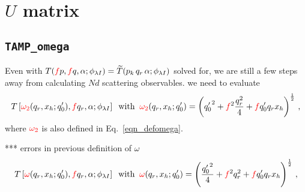 \documentclass[11pt,aps]{revtex4}
\newcommand{\PF}{{\color{red}f}}
\newcommand{\cor}[1]{{\color{blue} #1 }}
\newcommand{\orig}[1]{{\color{red} #1 }}
\newcommand{\cmplx}[1]{{\color{red} #1 }}
\begin{document}
\section{$U$ matrix}

\subsection{\texttt{TAMP\_omega}}
Even with $T(\PF p, \PF q, \alpha; \phi_{\lambda I}) = \widetilde{T}(p_k\, q_r\, \alpha; \phi_{\lambda I})$ solved for, we are still a few steps away from calculating $N d$ scattering observables.
we need to evaluate
\cor{
\begin{equation}
  T\left[\cmplx{\omega_2}(q_r, x_h; q_0'), \PF q_r, \alpha; \phi_{\lambda I} \right] \;\; \text{with}\; \; \cmplx{\omega_2}(q_r, x_h; q_0') = \left({q'_0}^2 + \PF^2 \frac{q_r^2}{4} + \PF {q'_0} q_r x_h \right)^{\frac{1}{2}} \, ,
\end{equation}
}
where $\cmplx{\omega_2}$ is also defined in Eq.~\eqref{eqn_defomega}.

\orig{
*** errors in previous definition of $\omega$
\begin{equation*}
  T\left[\cmplx{\omega}(q_r, x_h; q_0'), \PF q_r, \alpha; \phi_{\lambda I} \right] \;\; \text{with}\; \; \cmplx{\omega}(q_r, x_h; q_0') = \left(\frac{{q'_0}^2}{4} + \PF^2 q_r^2 + \PF {q'_0} q_r x_h \right)^{\frac{1}{2}} \, ,
\end{equation*}
}
\end{document}
